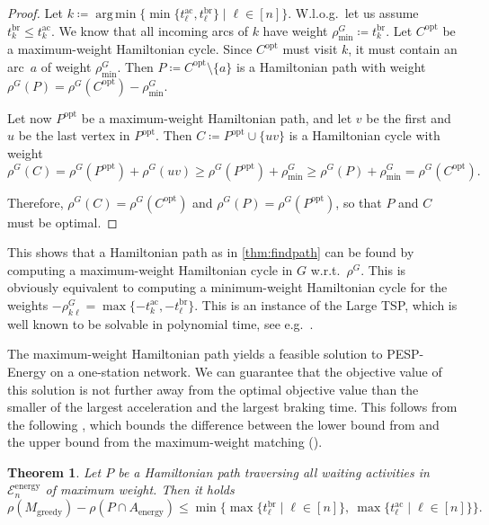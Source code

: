 \documentclass[11pt,a4paper]{article}
\newcommand{\energy}{\mathrm{energy}}
\newcommand{\energyact}{M}               %
\newcommand{\ac}{\mathrm{ac}}
\newcommand{\br}{\mathrm{br}}
\newcommand{\opt}{\mathrm{opt}}
\newcommand{\pespenergy}{PESP-Energy\xspace}
\newcommand{\osn}{one-station network\xspace}
\newcommand{\w}{\rho} %
\newcommand{\cE}{\mathcal{E}}
\newcommand{\argmin}{\operatorname{arg\,min}}
\newtheorem{theorem}{Theorem}[section]
\theoremstyle{definition}
\theoremstyle{remark}
\begin{document}
\begin{proof}
	Let $k \coloneqq \argmin\{ \min\{ t_{\ell}^{\ac}, t_\ell^{\br} \} \mid \ell \in [n]\}$. W.l.o.g.\ let us assume $t_{k}^{\br} \leq t_k^{\ac}$. We know that all incoming arcs of $k$ have weight $\w^G_{\min} \coloneqq t_{k}^{\br}$.
	Let $C^{\opt}$ be a maximum-weight Hamiltonian cycle. Since $C^{\opt}$ must visit $k$, it must contain an arc~$a$ of weight $\w^G_{\min}$. Then $P \coloneqq C^{\opt}\setminus \{a\}$ is a Hamiltonian path with weight $\w^G(P) = \w^G(C^{\opt}) - \w^G_{\min}$.
	
	Let now $P^{\opt}$ be a maximum-weight Hamiltonian path, and let $v$ be the first and $u$ be the last vertex in $P^{\opt}$. Then $C \coloneqq P^{\opt} \cup \{uv\}$ is a Hamiltonian cycle with weight 
    $$\w^G(C) = \w^G(P^{\opt}) + \w^G(uv) \ge \w^G(P^{\opt}) + \w^G_{\min} \geq \w^G(P) + \w^G_{\min} = \w^G(C^{\opt}).$$
	
	Therefore, $\w^G(C) = \w^G(C^{\opt})$ and $\w^G(P) = \w^G( P^{\opt})$, so that
    $P$ and $C$ must be optimal.
\end{proof}

This shows that a Hamiltonian path as in \cref{thm:findpath} can be found by computing a maximum-weight Hamiltonian cycle in $G$ w.r.t.\ $\w^G$. This is obviously equivalent to computing a minimum-weight Hamiltonian cycle for the weights $-\w^G_{k\ell} = \max\{-t_k^\ac, -t_\ell^\br\}$. This is an instance of the Large TSP, which is well known to be solvable in polynomial time, see e.g.~\cite{vanDal}.

The maximum-weight Hamiltonian path yields a feasible solution to \pespenergy on a \osn. We can guarantee that the objective value of this solution is not further away from the optimal objective value than the smaller of the largest acceleration and the largest braking time. This follows from the following , which bounds the difference between the lower bound from  and the upper bound from the maximum-weight matching ().

\begin{theorem}\label{thm:boundH}
	Let $P$ be a Hamiltonian path traversing all waiting activities in $\cE_n^{\energy}$ of maximum weight. Then it holds
	\[\w(\energyact_\mathrm{greedy}) - \w(P \cap A_\energy) \leq  \min\bigl\{ \max\{t^{\br}_\ell \mid \ell \in [n]\} ,\ \max\{t^{\ac}_\ell \mid \ell \in [n]\}\bigr\}.\]
\end{theorem}
\end{document}
